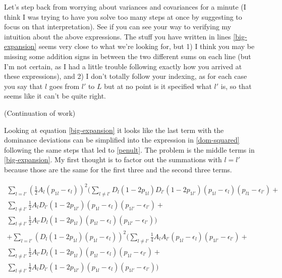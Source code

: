 \documentclass[a4paper,10pt]{article}
\newcommand{\jb}[1]{{\color{blue} (#1)} }
\begin{document}
    Let's step back from worrying about variances and covariances for
    a minute (I think I was trying to have you solve too many steps at
    once by suggesting to focus on that interpretation). See if you
    can see your way to verifying my intuition about the above
    expressions. The stuff you have written in lines
    \eqref{big-expansion} seems very close to what we're looking for,
    but 1) I think you may be missing some addition signs in between
    the two different sums on each line (but I'm not certain, as I had
    a little trouble following exactly how you arrived at these
    expressions), and 2) I don't totally follow your indexing, as for
    each case you say that $l$ goes from $l'$ to $L$ but at no point
    is it specified what $l'$ is, so that seems like it can't be quite
    right.



 \vspace{10mm}

 \jb{Continuation of work}

 \vspace{5mm}

 Looking at equation \eqref{big-expansion} it looks like the last
 term with the dominance deviations can be simplified into the
 expression in \eqref{dom-squared} following the same steps that led
 to \eqref{penult}. The problem is the middle terms in
 \eqref{big-expansion}. My first thought is to factor out the
 summations with $l=l'$ because those are the same for the first three
 and the second three terms. 

 \begin{equation}
   \begin{split}   
   \sum_{l=l'}(\frac{1}{2}A_l(p_{1l}-\epsilon_l))^2 (\sum_{l
     \neq
     l'}D_l(1-2p_{1l})D_{l'}(1-2p_{1l'})(p_{1l}-\epsilon_l)(p_{l1}-\epsilon_{l'})+
   \\
   \sum_{l \neq l'}\frac{1}{2}A_{l}D_{l'}(1-2p_{1l'})(p_{1l}-\epsilon_l)(p_{1l'}-\epsilon_{l'})+
   \\
   \sum_{l \neq l'}\frac{1}{2}A_{l'}D_l(1-2p_{1l})(p_{1l}-\epsilon_l)(p_{1l'}-\epsilon_{l'}))
   \\
   + \sum_{l=l'}(D_l(1-2p_{1l})(p_{1l}-\epsilon_l))^2 (\sum_{l
     \neq l'}\frac{1}{4}A_lA_{l'}(p_{1l}-\epsilon_l)(p_{1l'}-\epsilon_{l'})+
   \\
   \sum_{l \neq l'}\frac{1}{2}A_{l'}D_l(1-2p_{1l})(p_{1l}-\epsilon_l)(p_{1l}-\epsilon_{l'})+
   \\
   \sum_{l \neq l'} \frac{1}{2}A_{l}D_{l'}(1-2p_{1l'})(p_{1l}-\epsilon_l)(p_{1l'}-\epsilon_{l'}))
   \end{split}
\end{equation}\label{factored} 



    


\end{document}
